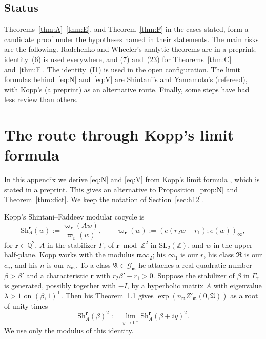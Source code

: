 \documentclass[11pt]{amsart}
\numberwithin{equation}{section}
\theoremstyle{plain}
\theoremstyle{definition}
\theoremstyle{remark}
\begin{document}
\subsection*{Status}
Theorems~\ref{thm:A}--\ref{thm:E}, and Theorem~\ref{thm:F} in the cases stated, form a candidate proof under the hypotheses named in their statements. The main risks are the following. Radchenko and Wheeler's analytic theorems are in a preprint; identity~(6) is used everywhere, and (7) and~(23) for Theorems~\ref{thm:C} and~\ref{thm:F}. The identity~(I1) is used in the open configuration. The limit formulas behind~\eqref{eq:N} and~\eqref{eq:V} are Shintani's and Yamamoto's (refereed), with Kopp's (a preprint) as an alternative route. Finally, some steps have had less review than others.

\appendix
\section{The route through Kopp's limit formula}\label{app:kopp}

In this appendix we derive \eqref{eq:N} and \eqref{eq:V} from Kopp's limit formula \cite[Thm.~1.1]{Ko}, which is stated in a preprint. This gives an alternative to Proposition~\ref{prop:N} and Theorem~\ref{thm:dict}. We keep the notation of Section~\ref{sec:h12}.

Kopp's Shintani--Faddeev modular cocycle is
\[\mathrm{Sh}^{\mathbf r}_A(w):=\frac{\varpi_{\mathbf r}(Aw)}{\varpi_{\mathbf r}(w)},\qquad \varpi_{\mathbf r}(w):=(e(r_2w-r_1);e(w))_\infty,\]
for $\mathbf r\in\mathbb Q^2$, $A$ in the stabilizer $\Gamma_{\mathbf r}$ of $\mathbf r\bmod\mathbb Z^2$ in $\mathrm{SL}_2(\mathbb Z)$, and $w$ in the upper half-plane. Kopp works with the modulus $\mathfrak m\infty_2$; his $\infty_1$ is our $r$, his class $\mathfrak R$ is our $c_u$, and his $n$ is our $n_{\mathfrak m}$. To a class $\mathfrak A\in\mathcal G_{\mathfrak m}$ he attaches a real quadratic number $\beta>\beta'$ and a characteristic $\mathbf r$ with $r_2\beta'-r_1>0$. Suppose the stabilizer of $\beta$ in $\Gamma_{\mathbf r}$ is generated, possibly together with $-I$, by a hyperbolic matrix $A$ with eigenvalue $\lambda>1$ on $(\beta,1)^{\mathsf T}$. Then his Theorem~1.1 gives $\exp(n_{\mathfrak m}Z'_{\mathfrak m}(0,\mathfrak A))$ as a root of unity times
\[\mathrm{Sh}^{\mathbf r}_A(\beta)^2:=\lim_{y\to0^+}\mathrm{Sh}^{\mathbf r}_A(\beta+iy)^2 .\]
We use only the modulus of this identity.
\end{document}
